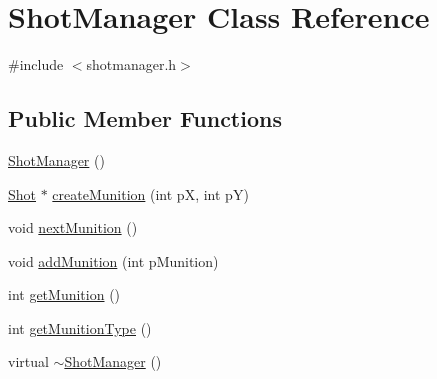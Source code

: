 \hypertarget{class_shot_manager}{\section{Shot\-Manager Class Reference}
\label{class_shot_manager}
}


{\ttfamily \#include $<$shotmanager.\-h$>$}

\subsection*{Public Member Functions}
\begin{DoxyCompactItemize}
\item 
\hyperlink{class_shot_manager_ab985b08b77a340ed984ed52e97aed7f9}{Shot\-Manager} ()
\item 
\hyperlink{class_shot}{Shot} $\ast$ \hyperlink{class_shot_manager_a9ffcd5b29ccba8b53308c5442c3cb13a}{create\-Munition} (int p\-X, int p\-Y)
\item 
void \hyperlink{class_shot_manager_aebd2c9ed59082d4382d367abd7b39dd5}{next\-Munition} ()
\item 
void \hyperlink{class_shot_manager_af5fe9ec898ebccb644e4fdaa679bb255}{add\-Munition} (int p\-Munition)
\item 
int \hyperlink{class_shot_manager_a90c9df4f00b6670ec3247f910f392d83}{get\-Munition} ()
\item 
int \hyperlink{class_shot_manager_a1dd2f63018916237eea902a21cb1b7a7}{get\-Munition\-Type} ()
\item 
virtual \hyperlink{class_shot_manager_a65fff2c4a3470f7ae28633fe24b02d2e}{$\sim$\-Shot\-Manager} ()
\end{DoxyCompactItemize}


